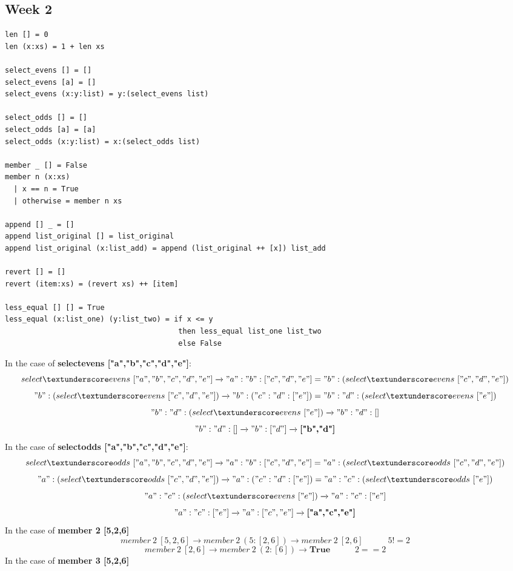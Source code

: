 \documentclass{article}
\theoremstyle{theorem}
\theoremstyle{definition}
\theoremstyle{remark}
\begin{document}
\subsection{Week 2}
\begin{lstlisting}
len [] = 0
len (x:xs) = 1 + len xs

select_evens [] = []
select_evens [a] = []
select_evens (x:y:list) = y:(select_evens list)

select_odds [] = []
select_odds [a] = [a]
select_odds (x:y:list) = x:(select_odds list)

member _ [] = False
member n (x:xs)
  | x == n = True
  | otherwise = member n xs

append [] _ = []
append list_original [] = list_original
append list_original (x:list_add) = append (list_original ++ [x]) list_add

revert [] = []
revert (item:xs) = (revert xs) ++ [item]

less_equal [] [] = True
less_equal (x:list_one) (y:list_two) = if x <= y
									    then less_equal list_one list_two
									    else False
\end{lstlisting}
In the case of \textbf{select\textunderscore evens ["a","b","c","d","e"]}:
$$
select\textunderscore evens \ ["a","b","c","d","e"] \xrightarrow{} "a":"b":["c","d","e"] = "b":(select\textunderscore evens \ ["c","d","e"])
$$
$$
"b":(select\textunderscore evens \ ["c","d","e"]) \xrightarrow{}
"b":("c":"d":["e"]) = "b":"d":(select\textunderscore evens \ ["e"])
$$
$$
"b":"d":(select\textunderscore evens \ ["e"]) \xrightarrow{} "b":"d":[]
$$
$$
"b":"d":[] \xrightarrow{} "b":["d"] \xrightarrow{} \textbf{["b","d"]}
$$
In the case of \textbf{select\textunderscore odds ["a","b","c","d","e"]}:
$$
select\textunderscore odds \ ["a","b","c","d","e"] \xrightarrow{} "a":"b":["c","d","e"] = "a":(select\textunderscore odds \ ["c","d","e"])
$$
$$
"a":(select\textunderscore odds \ ["c","d","e"]) \xrightarrow{}
"a":("c":"d":["e"]) = "a":"c":(select\textunderscore odds \ ["e"])
$$
$$
"a":"c":(select\textunderscore evens \ ["e"]) \xrightarrow{} "a":"c":["e"]
$$
$$
"a":"c":["e"] \xrightarrow{} "a":["c","e"] \xrightarrow{} \textbf{["a","c","e"]}
$$
In the case of \textbf{member 2 [5,2,6]}
$$
member \ 2 \ [5,2,6] \xrightarrow{} member \ 2 \ (5:[2,6]) \xrightarrow{} member \ 2 \ [2,6] \hspace{35pt} 5 != 2
$$
$$
member \ 2 \ [2,6] \xrightarrow{} member \ 2 \ (2:[6]) \xrightarrow{} \textbf{True} \hspace{35pt} 2 == 2
$$
In the case of \textbf{member 3 [5,2,6]}
\end{document}

